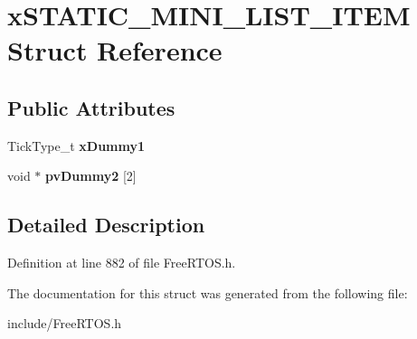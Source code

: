 \hypertarget{structxSTATIC__MINI__LIST__ITEM}{}\section{x\+S\+T\+A\+T\+I\+C\+\_\+\+M\+I\+N\+I\+\_\+\+L\+I\+S\+T\+\_\+\+I\+T\+EM Struct Reference}
\label{structxSTATIC__MINI__LIST__ITEM}
\subsection*{Public Attributes}
\begin{DoxyCompactItemize}
\item 
\mbox{\label{structxSTATIC__MINI__LIST__ITEM_a43efd282907e8243bca29338d55dbefa}} 
Tick\+Type\+\_\+t {\bfseries x\+Dummy1}
\item 
\mbox{\label{structxSTATIC__MINI__LIST__ITEM_a384ac285efb6edf346f260bdc09ccac6}} 
void $\ast$ {\bfseries pv\+Dummy2} \mbox{[}2\mbox{]}
\end{DoxyCompactItemize}


\subsection{Detailed Description}


Definition at line 882 of file Free\+R\+T\+O\+S.\+h.



The documentation for this struct was generated from the following file\+:\begin{DoxyCompactItemize}
\item 
include/Free\+R\+T\+O\+S.\+h\end{DoxyCompactItemize}
